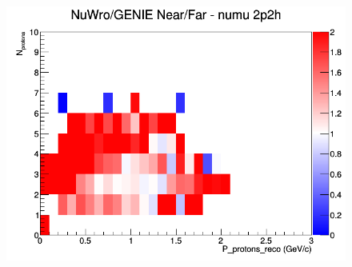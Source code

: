 \begin{figure}[h]
\endminipage
{}
\includegraphics[width=\linewidth]{eff_N_P/GAr/protons/ratios/2p2h_NuWro_GENIE_numu_NF_N_P.png}
\endminipage
\newline
\end{figure}
\clearpage
